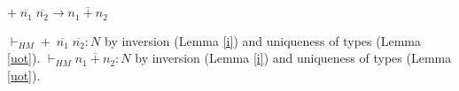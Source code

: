 \begin{case}
$+\;\overline{n_{1}}\;\overline{n_{2}}\rightarrow\overline{n_{1}+n_{2}}$

$\vdash_{HM}+\;\overline{n_{1}}\;\overline{n_{2}}:N$ by inversion (Lemma \ref{i}) and uniqueness of types (Lemma \ref{uot}).  $\vdash_{HM}\overline{n_{1}+n_{2}}:N$ by inversion (Lemma \ref{i}) and uniqueness of types (Lemma \ref{uot}).
\end{case}